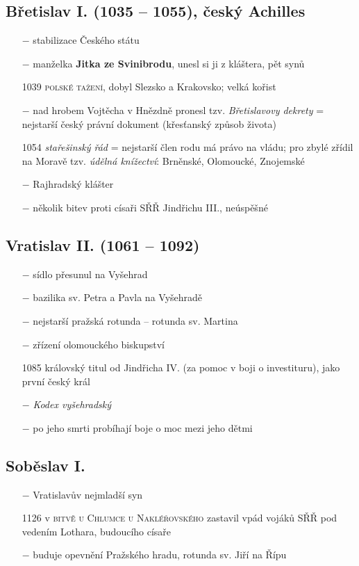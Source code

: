 \documentclass{article}
\begin{document}
\subsection*{Břetislav I. (1035 -- 1055), český Achilles}
\begin{itemize}
    \vspace{-0.5em}
    \setlength\itemsep{0.15em}
    \item[$-$] stabilizace Českého státu
    \item[$-$] manželka \textbf{Jitka ze Svinibrodu}, unesl si ji z kláštera, pět synů
    \item[1039] \textsc{polské tažení}, dobyl Slezsko a Krakovsko; velká kořist
    \item[$-$] nad hrobem Vojtěcha v Hnězdně pronesl tzv. \textit{Břetislavovy dekrety} = nejstarší český právní dokument (křesťanský způsob života)
    \item[1054] \textit{stařešinský řád} = nejstarší člen rodu má právo na vládu; pro zbylé zřídil na Moravě tzv. \textit{údělná knížectví}: Brněnské, Olomoucké, Znojemské
    \item[$-$] Rajhradský klášter
    \item[$-$] několik bitev proti císaři SŘŘ Jindřichu III., neúspěšné
\end{itemize}

\subsection*{Vratislav II. (1061 -- 1092)}
\begin{itemize}
    \vspace{-0.5em}
    \setlength\itemsep{0.15em}
    \item[$-$] sídlo přesunul na Vyšehrad
    \item[$-$] bazilika sv. Petra a Pavla na Vyšehradě
    \item[$-$] nejstarší pražská rotunda -- rotunda sv. Martina
    \item[$-$] zřízení olomouckého biskupství
    \item[1085] královský titul od Jindřicha IV. (za pomoc v boji o investituru), jako první český král
    \item[$-$] \textit{Kodex vyšehradský}
    \item[$-$] po jeho smrti probíhají boje o moc mezi jeho dětmi
\end{itemize}

\subsection*{Soběslav I.}
\begin{itemize}
    \vspace{-0.5em}
    \setlength\itemsep{0.15em}
    \item[$-$] Vratislavův nejmladší syn
    \item[1126] v \textsc{bitvě u Chlumce u Nakléřovského} zastavil vpád vojáků SŘŘ pod vedením Lothara, budoucího císaře
    \item[$-$] buduje opevnění Pražského hradu, rotunda sv. Jiří na Řípu
\end{itemize}
\end{document}

